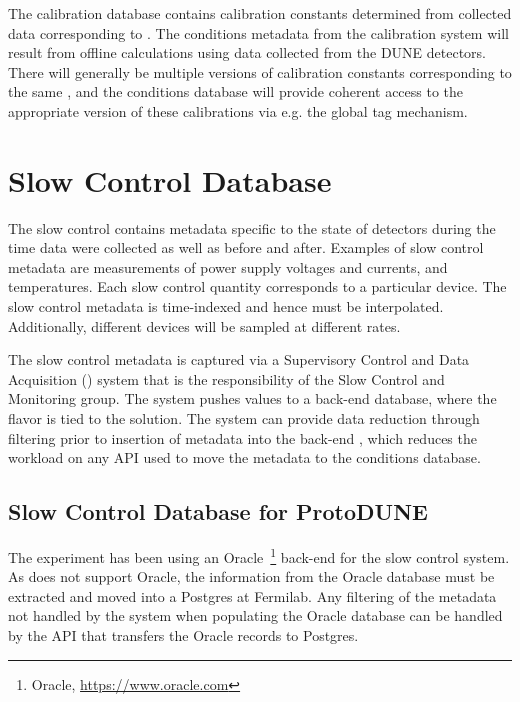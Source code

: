 \documentclass[../main-v1.tex]{subfiles}
\begin{document}
The calibration database contains calibration constants determined from collected data corresponding to  . The conditions metadata from the calibration system will result from offline calculations using data collected from the DUNE detectors.
There will generally be multiple versions of calibration constants corresponding to the same , and the conditions database will provide coherent access to the appropriate version of these calibrations via e.g. the global tag mechanism.

\section{Slow Control Database }
\label{sec:db:slowcontrol}  

The slow control  contains metadata specific to the state of detectors during the time data were collected as well as before and after. Examples of slow control metadata are measurements of power supply voltages and currents, and temperatures. Each slow control quantity corresponds to a particular device. The slow control  metadata is time-indexed and hence must be interpolated. Additionally, different devices will be sampled at different rates.

The slow control metadata is captured via a Supervisory Control and Data Acquisition () system that is the responsibility of the Slow Control and Monitoring group. The   system pushes values to a back-end database, where the  flavor is tied to the  solution. 
The   system can provide data reduction through filtering prior to insertion of metadata into the back-end , which reduces the workload on any API used to move the metadata to the conditions database. 

\subsection{Slow Control Database for ProtoDUNE}
\label{sec:slowcontrolPD}

The  experiment has been using an Oracle~\footnote{Oracle\textcopyright, \url{https://www.oracle.com}} back-end  for the slow control system. As 
does not support Oracle, the information from the Oracle database must be extracted and moved into a Postgres  at Fermilab. Any filtering of the metadata not handled by the   system when populating the Oracle database can be handled by the API that transfers the Oracle records to Postgres.
\end{document}
